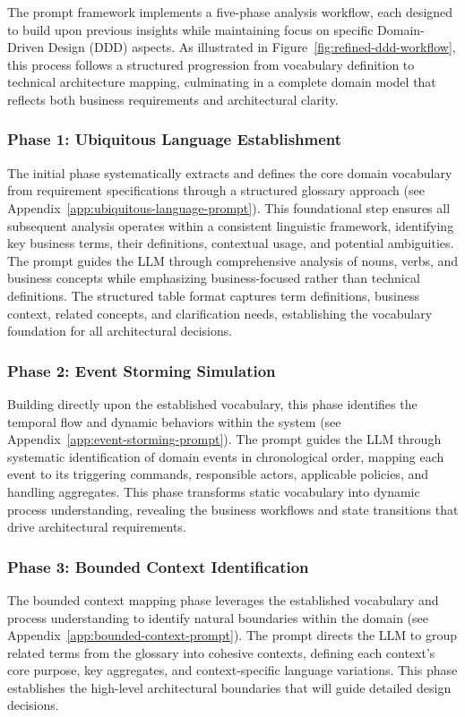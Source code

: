 The prompt framework implements a five-phase analysis workflow, each designed to build upon previous insights while maintaining focus on specific Domain-Driven Design (DDD) aspects. As illustrated in Figure~\ref{fig:refined-ddd-workflow}, this process follows a structured progression from vocabulary definition to technical architecture mapping, culminating in a complete domain model that reflects both business requirements and architectural clarity.

\subsubsection{Phase 1: Ubiquitous Language Establishment}
The initial phase systematically extracts and defines the core domain vocabulary from requirement specifications through a structured glossary approach (see Appendix~\ref{app:ubiquitous-language-prompt}). This foundational step ensures all subsequent analysis operates within a consistent linguistic framework, identifying key business terms, their definitions, contextual usage, and potential ambiguities. The prompt guides the LLM through comprehensive analysis of nouns, verbs, and business concepts while emphasizing business-focused rather than technical definitions. The structured table format captures term definitions, business context, related concepts, and clarification needs, establishing the vocabulary foundation for all architectural decisions.

\subsubsection{Phase 2: Event Storming Simulation}
Building directly upon the established vocabulary, this phase identifies the temporal flow and dynamic behaviors within the system (see Appendix~\ref{app:event-storming-prompt}). The prompt guides the LLM through systematic identification of domain events in chronological order, mapping each event to its triggering commands, responsible actors, applicable policies, and handling aggregates. This phase transforms static vocabulary into dynamic process understanding, revealing the business workflows and state transitions that drive architectural requirements.

\subsubsection{Phase 3: Bounded Context Identification}
The bounded context mapping phase leverages the established vocabulary and process understanding to identify natural boundaries within the domain (see Appendix~\ref{app:bounded-context-prompt}). The prompt directs the LLM to group related terms from the glossary into cohesive contexts, defining each context's core purpose, key aggregates, and context-specific language variations. This phase establishes the high-level architectural boundaries that will guide detailed design decisions.

